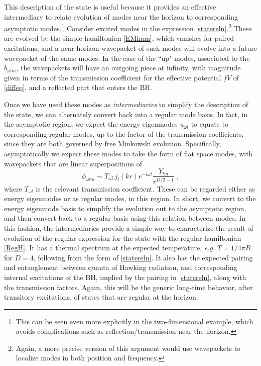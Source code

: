 \documentclass[12pt]{article}
\numberwithin{equation}{section}
\newcommand{\beq}{\begin{equation}}
\newcommand{\eeq}{\end{equation}}
\begin{document}
This description of the state is useful because it provides an effective intermediary to relate evolution of modes near the horizon to corresponding asymptotic modes.\footnote{This can be seen even more explicitly in the two-dimensional example\cite{SE2d}, which avoids complications such as reflection/transmission near the horizon.}  Consider  excited modes in the expression \eqref{statereln}.\footnote{Again, a more precise version of this argument would use wavepackets to localize modes in both position and frequency.}  These are evolved by the simple hamiltonian \eqref{EMham}, which vanishes for paired excitations, and a near-horizon wavepacket of such modes will evolve into a future wavepacket of the same modes.  In the case of the ``up" modes, associated to the $b_{\omega l m}$, the wavepackets will have an outgoing piece at infinity, with magnitude given in terms of the transmission coefficient for the effective potential $fV$ of \eqref{diffeq}, and a reflected part that enters the BH.

Once we have used these modes as {\it intermediaries} to simplify the description of the state, we can alternately convert back into a regular mode basis.  In fact, in the asymptotic region, we expect the energy eigenmodes $u_{\omega l}$ to equate to corresponding regular modes, up to the factor of the transmission coefficients, since they are both governed by free Minkowski evolution.   Specifically, asymptotically we expect these modes to take the form of flat space modes, with wavepackets that are linear superpositions of
\beq
\phi_{\omega l m} \sim T_{\omega l}\, j_l(kr) e^{-i\omega t}\frac{Y_{lm}}{r^{D/2-1}}\ ,
\eeq
where $T_{\omega l}$ is the relevant transmission coefficient.  These can be regarded either as energy eigenmodes or as regular modes, in this region.
 In short, we convert to the energy eigenmode basis to simplify the evolution out to the asymptotic region, and then convert back to a regular basis using this relation between modes.
In this fashion, the intermediaries provide a simple way to characterize the result of evolution of the regular expression for the state with the regular hamiltonian \eqref{RegH}.   It has a thermal spectrum at the expected temperature, {\it e.g.}  $T=1/4\pi R$ for $D=4$, following from the form of \eqref{statereln}.  It also has the expected pairing and entanglement between  quanta of Hawking radiation, and corresponding internal excitations of the BH, implied by the pairing in  \eqref{statereln}, along with the transmission factors.  Again, this will be the generic long-time behavior, after transitory excitations, of states that are regular at the horizon.
\end{document}
